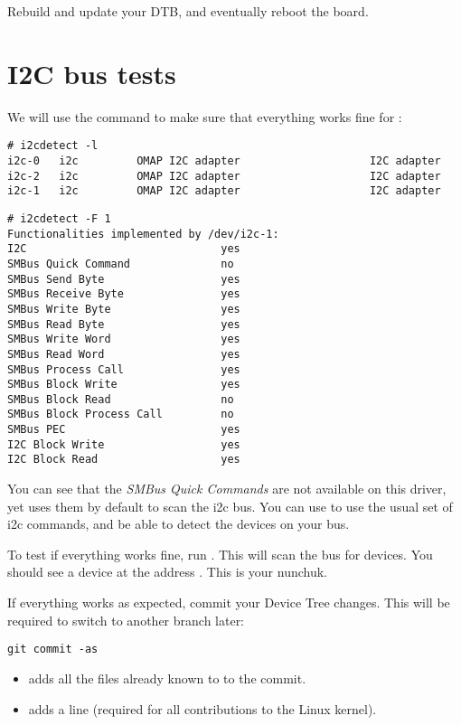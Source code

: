 Rebuild and update your DTB, and eventually reboot the board.

\section{I2C bus tests}

We will use the  command to make sure that
everything works fine for :

\begin{verbatim}
# i2cdetect -l
i2c-0	i2c       	OMAP I2C adapter                	I2C adapter
i2c-2	i2c       	OMAP I2C adapter                	I2C adapter
i2c-1	i2c       	OMAP I2C adapter                	I2C adapter
\end{verbatim}

\begin{verbatim}
# i2cdetect -F 1
Functionalities implemented by /dev/i2c-1:
I2C                              yes
SMBus Quick Command              no
SMBus Send Byte                  yes
SMBus Receive Byte               yes
SMBus Write Byte                 yes
SMBus Read Byte                  yes
SMBus Write Word                 yes
SMBus Read Word                  yes
SMBus Process Call               yes
SMBus Block Write                yes
SMBus Block Read                 no
SMBus Block Process Call         no
SMBus PEC                        yes
I2C Block Write                  yes
I2C Block Read                   yes
\end{verbatim}

You can see that the {\em SMBus Quick Commands} are not available on
this driver, yet  uses them by default to scan the i2c
bus. You can use  to use the usual set of i2c
commands, and be able to detect the devices on your bus.

To test if everything works fine, run . This will
scan the  bus for devices. You should see a device at the
address . This is your nunchuk.

If everything works as expected, commit your Device Tree changes. This
will be required to switch to another branch later:

\begin{verbatim}
git commit -as
\end{verbatim}

\begin{itemize}
\item {} adds all the files already known to
       to the commit.
\item {} adds a  line (required
      for all contributions to the Linux kernel).
\end{itemize}

